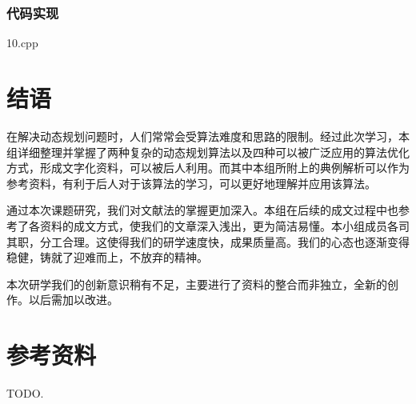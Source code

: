 \documentclass[a4paper, UTF8]{ctexart}
\begin{document}
\subsubsection{代码实现}

10.cpp

\section{结语}

在解决动态规划问题时，人们常常会受算法难度和思路的限制。经过此次学习，本组详细整理并掌握了两种复杂的动态规划算法以及四种可以被广泛应用的算法优化方式，形成文字化资料，可以被后人利用。而其中本组所附上的典例解析可以作为参考资料，有利于后人对于该算法的学习，可以更好地理解并应用该算法。

通过本次课题研究，我们对文献法的掌握更加深入。本组在后续的成文过程中也参考了各资料的成文方式，使我们的文章深入浅出，更为简洁易懂。本小组成员各司其职，分工合理。这使得我们的研学速度快，成果质量高。我们的心态也逐渐变得稳健，铸就了迎难而上，不放弃的精神。

本次研学我们的创新意识稍有不足，主要进行了资料的整合而非独立，全新的创作。以后需加以改进。

\section{参考资料}

TODO.
\end{document}
